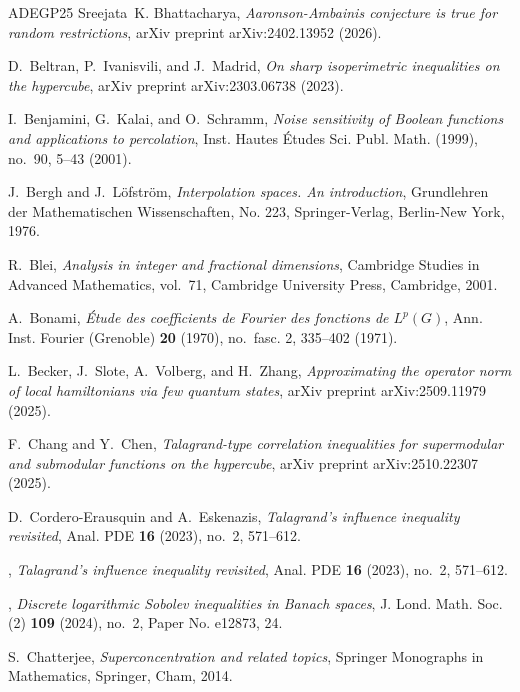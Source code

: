 \documentclass{amsbook}
\theoremstyle{definition}
\theoremstyle{remark}
\numberwithin{section}{chapter}
\numberwithin{equation}{chapter}
\newcommand{\1}{\mathbf{1}}
\begin{document}
\begin{thebibliography}{ADEGP25}
	Sreejata~K. Bhattacharya, \emph{{A}aronson-{A}mbainis conjecture is true for
		random restrictions}, arXiv preprint arXiv:2402.13952 (2026).
	
	D.~Beltran, P.~Ivanisvili, and J.~Madrid, \emph{On sharp isoperimetric
		inequalities on the hypercube}, arXiv preprint arXiv:2303.06738 (2023).
	
	I.~Benjamini, G.~Kalai, and O.~Schramm, \emph{Noise sensitivity of {B}oolean
		functions and applications to percolation}, Inst. Hautes \'{E}tudes Sci.
	Publ. Math. (1999), no.~90, 5--43 (2001). 
	
	J.~Bergh and J.~L\"{o}fstr\"{o}m, \emph{Interpolation spaces. {A}n
		introduction}, Grundlehren der Mathematischen Wissenschaften, No. 223,
	Springer-Verlag, Berlin-New York, 1976. 
	
	R.~Blei, \emph{Analysis in integer and fractional dimensions}, Cambridge
	Studies in Advanced Mathematics, vol.~71, Cambridge University Press,
	Cambridge, 2001. 
	
	A.~Bonami, \emph{\'{E}tude des coefficients de {F}ourier des fonctions de
		{$L^{p}(G)$}}, Ann. Inst. Fourier (Grenoble) \textbf{20} (1970), no.~fasc. 2,
	335--402 (1971). 
	
	L.~Becker, J.~Slote, A.~Volberg, and H.~Zhang, \emph{Approximating the operator
		norm of local hamiltonians via few quantum states}, arXiv preprint
	arXiv:2509.11979 (2025).
	
	F.~Chang and Y.~Chen, \emph{Talagrand-type correlation inequalities for
		supermodular and submodular functions on the hypercube}, arXiv preprint
	arXiv:2510.22307 (2025).
	
	D.~Cordero-Erausquin and A.~Eskenazis, \emph{Talagrand's influence inequality
		revisited}, Anal. PDE \textbf{16} (2023), no.~2, 571--612. 
	
	\bysame, \emph{Talagrand's influence inequality revisited}, Anal. PDE
	\textbf{16} (2023), no.~2, 571--612. 
	
	\bysame, \emph{Discrete logarithmic {S}obolev inequalities in {B}anach spaces},
	J. Lond. Math. Soc. (2) \textbf{109} (2024), no.~2, Paper No. e12873, 24.
	
	S.~Chatterjee, \emph{Superconcentration and related topics}, Springer
	Monographs in Mathematics, Springer, Cham, 2014.
	

\end{thebibliography}
\end{document}

